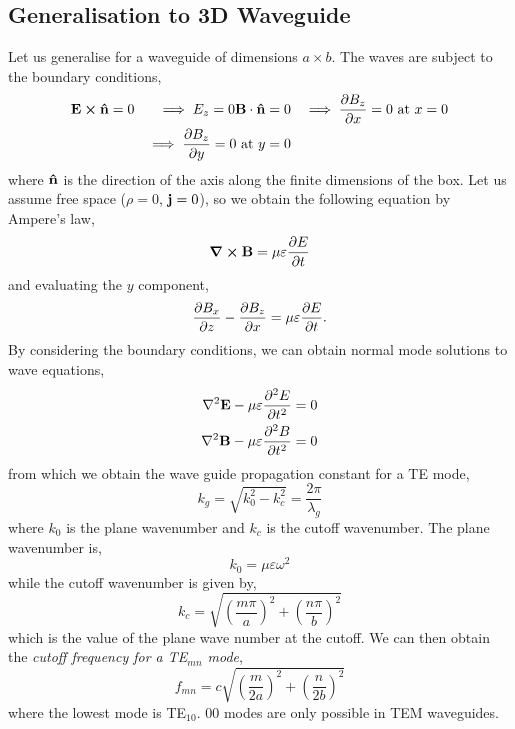 \documentclass{book}
\begin{document}
\subsection{Generalisation to 3D Waveguide}
Let us generalise for a waveguide of dimensions $a \times b$. The waves are subject to the boundary conditions,
\begin{align}
	\vb{E} \cross \vu{n} = 0 && \implies E_z = 0
	\vb{B} \cdot \vu{n} = 0 && \implies \pdv{B_z}{x} = 0 \text{ at } x = 0 \\
	&& \implies \pdv{B_z}{y} = 0 \text{ at } y = 0
\end{align}
where $\vu{n}$ is the direction of the axis along the finite dimensions of the box. Let us assume free space ($\rho=0$, $\vb{j} = 0$), so we obtain the following equation by Ampere's law,
\begin{equation}
	\curl{\vb{B}} = \mu\varepsilon\pdv{E}{t}
\end{equation}
and evaluating the $y$ component,
\begin{equation}
	\pdv{B_x}{z} - \pdv{B_z}{x} = \mu\varepsilon\pdv{E}{t}.
\end{equation}
By considering the boundary conditions, we can obtain normal mode solutions to wave equations,
\begin{align}
	\laplacian{\vb{E}} - \mu\varepsilon\pdv[2]{E}{t} = 0 \\
	\laplacian{\vb{B}} - \mu\varepsilon\pdv[2]{B}{t} = 0
\end{align}
from which we obtain the wave guide propagation constant for a TE mode,
\begin{equation}
	k_g = \sqrt{k_0^2 - k_c^2} = \frac{2\pi}{\lambda_g}
\end{equation}
where $k_0$ is the plane wavenumber and $k_c$ is the cutoff wavenumber. The plane wavenumber is,
\begin{equation}
	k_0 = \mu\varepsilon\omega^2
\end{equation}
while the cutoff wavenumber is given by,
\begin{equation}
	k_c = \sqrt{\left(\frac{m\pi}{a}\right)^2 + \left(\frac{n\pi}{b}\right)^2}
\end{equation}
which is the value of the plane wave number at the cutoff. We can then obtain the \textit{cutoff frequency for a TE$_{mn}$ mode},
\begin{equation}
	\boxed{f_{mn} = c\sqrt{\left(\frac{m}{2a}\right)^2 + \left(\frac{n}{2b}\right)^2}}
\end{equation}
where the lowest mode is TE$_{10}$. $00$ modes are only possible in TEM waveguides.
\appendix 
\end{document}
